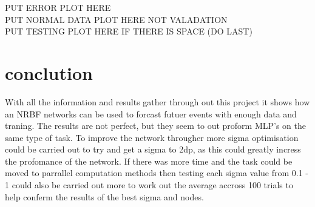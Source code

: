 \documentclass{IEEEtran}[11pt]
\begin{document}
\begin{flushleft}
  PUT ERROR PLOT HERE
  \\
  \vspace{5mm}
  PUT NORMAL DATA PLOT HERE NOT VALADATION
  \\
  \vspace{5mm}
  PUT TESTING PLOT HERE IF THERE IS SPACE (DO LAST)
\end{flushleft}

\section{conclution}
\begin{flushleft}
 With all the information and results gather through out this project it shows
 how an NRBF networks can be used to forcast futuer events with enough data and
 traning. The results are not perfect, but they seem to out proform MLP's on the
 same type of task. To improve the network througher more sigma optimisation
 could be carried out to try and get a sigma to 2dp, as this could greatly incress
 the profomance of the network. If there was more time and the task could be
 moved to parrallel computation methods then testing each sigma value from 0.1
 - 1 could also be carried out more to work out the average accross 100 trials to
 help conferm the results of the best sigma and nodes.
 \\
 \vspace{1.5mm}

\end{flushleft}
\end{document}
